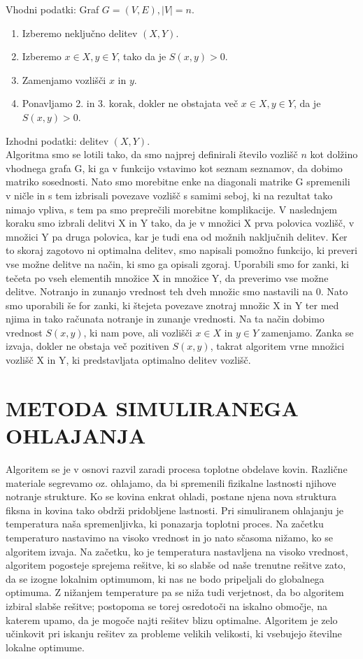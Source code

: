 \documentclass[12pt,a4paper]{amsart}
\theoremstyle{definition} %
\theoremstyle{plain} %
\begin{document}
Vhodni podatki: Graf $G=(V,E), |V|=n$.
\begin{enumerate}
\item Izberemo neključno delitev $(X,Y)$.
\item Izberemo $x\in X, y\in Y$, tako da je $S(x,y)>0$.
\item Zamenjamo vozlišči $x$ in $y$.
\item Ponavljamo 2. in 3. korak, dokler ne obstajata več $x\in X, y\in Y$, da je $S(x,y)>0$.
\end{enumerate}
Izhodni podatki: delitev $(X,Y)$. \\

Algoritma smo se lotili tako, da smo najprej definirali število vozlišč $n$ kot dolžino vhodnega grafa G, ki ga v funkcijo vstavimo kot seznam seznamov, da dobimo matriko sosednosti. Nato smo morebitne enke na diagonali matrike G spremenili v ničle in s tem izbrisali povezave vozlišč s samimi seboj, ki na rezultat tako nimajo vpliva, s tem pa smo preprečili morebitne komplikacije. V naslednjem koraku smo izbrali delitvi X in Y tako, da je v množici X prva polovica vozlišč, v množici Y pa druga polovica, kar je tudi ena od možnih naključnih delitev. Ker to skoraj zagotovo ni optimalna delitev, smo napisali pomožno funkcijo, ki preveri vse možne delitve na način, ki smo ga opisali zgoraj. Uporabili smo for zanki, ki tečeta po vseh elementih množice X in množice Y, da preverimo vse možne delitve. Notranjo in zunanjo vrednost teh dveh množic smo nastavili na 0. Nato smo uporabili še for zanki, ki štejeta povezave znotraj množic X in Y ter med njima in tako računata notranje in zunanje vrednosti. Na ta način dobimo vrednost $S(x,y)$, ki nam pove, ali vozlišči $x\in X$ in $y\in Y$ zamenjamo. Zanka se izvaja, dokler ne obstaja več pozitiven $S(x,y)$, takrat algoritem vrne množici vozlišč X in Y, ki predstavljata optimalno delitev vozlišč.
\bigbreak

\section{\textbf{METODA SIMULIRANEGA OHLAJANJA}}
Algoritem se je v osnovi razvil zaradi procesa toplotne obdelave kovin. Različne materiale segrevamo oz. ohlajamo, da bi spremenili fizikalne lastnosti njihove notranje strukture. Ko se kovina enkrat ohladi, postane njena nova struktura fiksna in kovina tako obdrži pridobljene lastnosti. Pri simuliranem ohlajanju je temperatura naša spremenljivka, ki ponazarja toplotni proces. Na začetku temperaturo nastavimo na visoko vrednost in jo nato sčasoma nižamo, ko se algoritem izvaja. Na začetku, ko je temperatura nastavljena na visoko vrednost, algoritem pogosteje sprejema rešitve, ki so slabše od naše trenutne rešitve zato, da se izogne lokalnim optimumom, ki nas ne bodo pripeljali do globalnega optimuma. Z nižanjem temperature pa se niža tudi verjetnost, da bo algoritem izbiral slabše rešitve; postopoma se torej osredotoči na iskalno območje, na katerem upamo, da je mogoče najti rešitev blizu optimalne. Algoritem je zelo učinkovit pri iskanju rešitev za probleme velikih velikosti, ki vsebujejo številne lokalne optimume.
\end{document}
